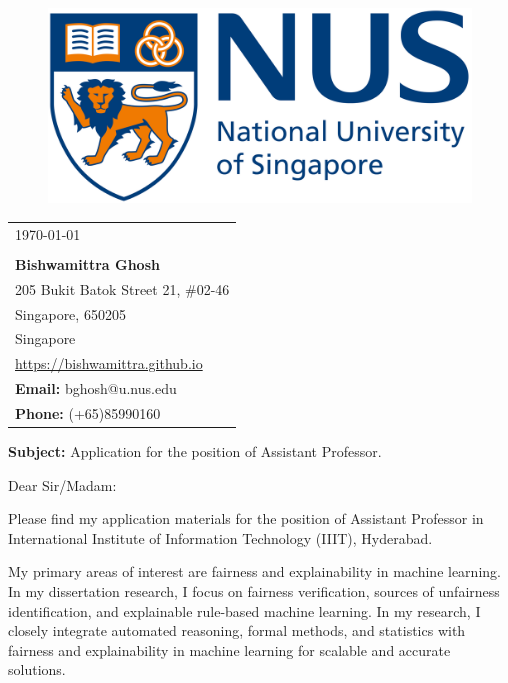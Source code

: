\documentclass[a4paper,10pt]{article}
\newcommand{\blue}[1]{\textcolor{blue}{#1}}
\begin{document}
	
	
	
	\begin{figure}[t]
		\includegraphics[scale=0.03]{logo}
	\end{figure}
	\noindent\makebox[\linewidth]{\rule{\textwidth}{1pt}}
	
	
	\begin{flushright}
		\begin{tabular}{l@{}}
			\today \\
			\newline \\
			\textbf{Bishwamittra Ghosh}\\
			205 Bukit Batok Street 21, \#02-46\\ 
			Singapore, 650205\\
			Singapore\\
			\blue{\url{https://bishwamittra.github.io}}\\
			\textbf{Email:} bghosh@u.nus.edu\\
			\textbf{Phone:} (+65)85990160\\
		\end{tabular}%
	\end{flushright}


	\textbf{Subject:} Application for the position of Assistant Professor. 
	
	
	
	\vspace{1em}
	Dear Sir/Madam:
	
	
	
	\vspace{1em}
	Please find my application materials for the position of Assistant Professor in International Institute of Information Technology (IIIT), Hyderabad.
	
	\vspace{1em}
	My primary areas of interest are  fairness and explainability in machine learning. In my dissertation research, I focus on  fairness verification, sources of unfairness identification, and  explainable rule-based machine learning. In my research, I closely integrate automated reasoning, formal methods, and statistics with fairness and explainability in machine learning for scalable and accurate solutions.
	
\end{document}
